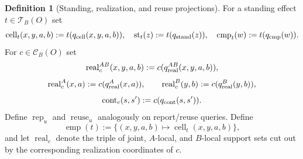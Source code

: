 \documentclass[11pt]{article}
\theoremstyle{definition}
\newtheorem{definition}[theorem]{Definition}
\begin{document}
\begin{definition}[Standing, realization, and reuse projections]\label{def:effectprojections}
For a standing effect $t\in\mathscr T_B(O)$ set
\[
\operatorname{cell}_t(x,y,a,b):=t(q_{\rm cell}(x,y,a,b)),\quad
\operatorname{st}_t(z):=t(q_{\rm stand}(z)),\quad
\operatorname{cmp}_t(w):=t(q_{\rm cmp}(w)).
\]
For $c\in\mathscr C_B(O)$ set
\[
\operatorname{real}^{AB}_c(x,y,a,b):=c(q^{AB}_{\rm real}(x,y,a,b)),
\]
\[
\operatorname{real}^{A}_c(x,a):=c(q^{A}_{\rm real}(x,a)),\qquad
\operatorname{real}^{B}_c(y,b):=c(q^{B}_{\rm real}(y,b)),
\]
\[
\operatorname{cont}_c(s,s'):=c(q_{\rm cont}(s,s')).
\]
Define $\operatorname{rep}_u$ and $\operatorname{reuse}_u$ analogously on report/reuse queries. Define
\[
\operatorname{emp}(t):=\{(x,y,a,b)\mapsto\operatorname{cell}_t(x,y,a,b)\},
\]
and let $\operatorname{real}_c$ denote the triple of joint, $A$-local, and $B$-local support sets cut out by the corresponding realization coordinates of $c$.
\end{definition}
\end{document}
